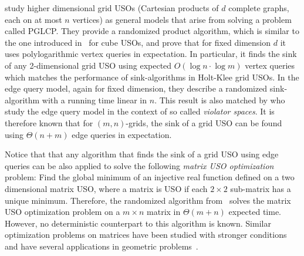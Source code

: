 \documentclass[runningheads,a4paper]{llncs}
\newcommand{\LB}[1]{\marginpar{\parbox{3.6cm}{{\small {\bf LB:} #1}}}} %
\newcommand{\sinkalg}{sink-algorithm\xspace}
\newcommand{\sinkalgs}{sink-algorithms\xspace}
\begin{document}

\citet{grid08} study higher dimensional grid USOs (Cartesian products of $d$ complete graphs, each on at most $n$ vertices) as general models that arise from solving a problem called PGLCP. 
They provide a randomized product algorithm, which is similar to the one introduced in~\cite{SW} for cube USOs, and prove that for fixed dimension $d$ it uses polylogarithmic vertex queries in expectation. 
In particular, it finds the sink of any 2-dimensional grid USO using expected $O(\log n \cdot \log m)$ vertex queries which matches the performance of \sinkalgs in Holt-Klee grid USOs.
In the edge query model, again for fixed dimension, they describe a randomized \sinkalg with a running time linear in $n$. This result is also matched by \citet{DBLP:journals/dam/GartnerMRS08} who study the edge query model in the context of so called \emph{violator spaces}. \LB{This is more general that LP-type}
It is therefore known that for $(m,n)$-grids, the sink of a grid USO can be found using $\Theta(n + m)$ edge queries in expectation.

Notice that that any algorithm that finds the sink of a grid USO using edge queries can be also applied to solve the following \emph{matrix USO optimization} problem: Find the global minimum of an injective real function defined on a two dimensional matrix USO, where a matrix is USO if each $2\times 2$ sub-matrix has a unique minimum. 
Therefore, the randomized algorithm from~\citet{grid08} solves the matrix USO optimization problem on a $m\times n$ matrix in $\Theta(m+n)$ expected time. However, no deterministic counterpart to this algorithm is known. 
Similar optimization problems on matrices have been studied with stronger conditions and have several applications in geometric problems~\cite{aggarwal1987geometric,demaine2005optimizing,galil1992dynamic,mityagin2003complexity}.
\end{document}
